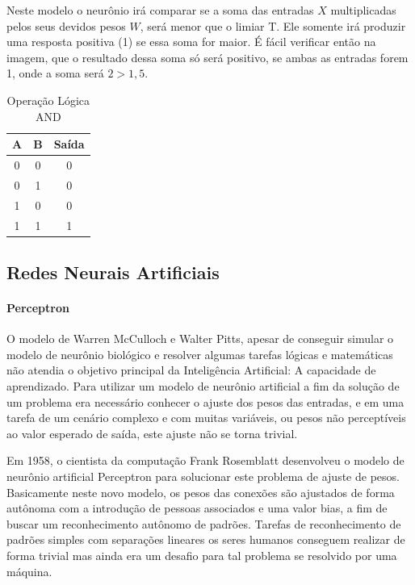 \documentclass[	12pt, Times, openright, twoside, a4paper, english, brazil]{abntex2}
\begin{document}
            Neste modelo o neurônio irá comparar se a soma das entradas $X$ multiplicadas pelos seus devidos pesos $W$, será menor que o limiar T. Ele somente irá produzir uma resposta positiva (1) se essa soma for maior. É fácil verificar então na imagem, que o resultado dessa soma só será positivo, se ambas as entradas forem 1, onde a soma será $2>1,5$.

            \begin{table}[!ht]
            \centering
            \caption{Operação Lógica AND} \label{tab:and}
              \begin{tabular}{|c|c|c|}
                  \hline  \textbf{A} & \textbf{B} &  \textbf{Saída}\\
                  \hline 0 & 0 & 0\\
                  \hline 0 & 1 & 0\\
                  \hline 1 & 0 & 0\\
                  \hline 1 & 1 & 1\\
                  \hline 
              \end{tabular}
            \end{table}

        \subsection{Redes Neurais Artificiais}
          \paragraph*{Perceptron}
            O modelo de Warren McCulloch e Walter Pitts, apesar de conseguir simular o modelo de neurônio biológico e resolver algumas tarefas lógicas e matemáticas não atendia o objetivo principal da Inteligência Artificial: A capacidade de aprendizado.
            Para utilizar um modelo de neurônio artificial a fim da solução de um problema era necessário conhecer o ajuste dos pesos das entradas, e em uma tarefa de um cenário complexo e com muitas variáveis, ou pesos não perceptíveis ao valor esperado de saída, este ajuste não se torna trivial.
            
            Em 1958, o cientista da computação Frank Rosemblatt desenvolveu o modelo de neurônio artificial Perceptron para solucionar este problema de ajuste de pesos.
            Basicamente neste novo modelo, os pesos das conexões são ajustados de forma autônoma com a introdução de pessoas associados e uma valor bias, a fim de buscar um reconhecimento autônomo de padrões. Tarefas de reconhecimento de padrões simples com separações lineares os seres humanos conseguem realizar de forma trivial mas ainda era um desafio para tal problema se resolvido por uma máquina.
\end{document}
